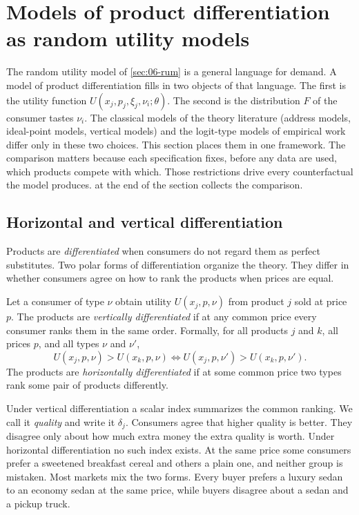 \section{Models of product differentiation as random utility models}\label{sec:06-models}

The random utility model of \cref{sec:06-rum} is a general language for demand. A model of product
differentiation fills in two objects of that language. The first is the utility function
$U(x_j, p_j, \xi_j, \nu_i; \theta)$. The second is the distribution $F$ of the consumer tastes $\nu_i$. The
classical models of the theory literature (address models, ideal-point models, vertical models) and the
logit-type models of empirical work differ only in these two choices. This section places them in one
framework. The comparison matters because each specification fixes, before any data are used, which
products compete with which. Those restrictions drive every counterfactual the model produces.
 at the end of the section collects the comparison.

\subsection{Horizontal and vertical differentiation}\label{sec:06-horvert}

Products are \emph{differentiated} when consumers do not regard them as perfect substitutes. Two polar
forms of differentiation organize the theory. They differ in whether consumers agree on how to rank the
products when prices are equal.

\begin{definition}\label{def:06-vertical}
Let a consumer of type $\nu$ obtain utility $U(x_j, p, \nu)$ from product $j$ sold at price $p$. The
products are \emph{vertically differentiated} if at any common price every consumer ranks them in the
same order. Formally, for all products $j$ and $k$, all prices $p$, and all types $\nu$ and $\nu'$,
\begin{equation*}
  U(x_j, p, \nu) > U(x_k, p, \nu) \iff U(x_j, p, \nu') > U(x_k, p, \nu').
\end{equation*}
The products are \emph{horizontally differentiated} if at some common price two types rank some pair of
products differently.
\end{definition}

Under vertical differentiation a scalar index summarizes the common ranking. We call it \emph{quality}
and write it $\delta_j$. Consumers agree that higher quality is better. They disagree only about how much
extra money the extra quality is worth. Under horizontal differentiation no such index exists. At the same
price some consumers prefer a sweetened breakfast cereal and others a plain one, and neither group is
mistaken. Most markets mix the two forms. Every buyer prefers a luxury sedan to an economy sedan at the
same price, while buyers disagree about a sedan and a pickup truck.

